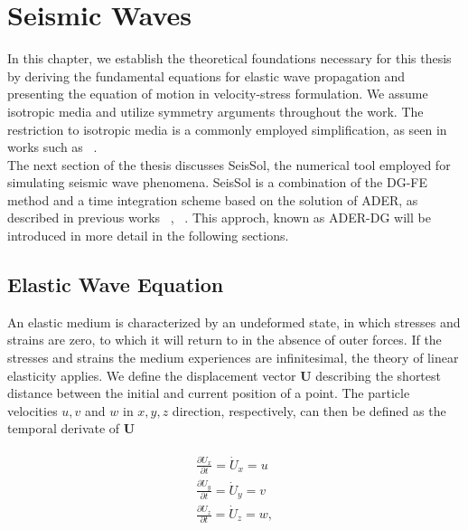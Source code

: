 
\chapter{Seismic Waves}\label{chapter:seismicwaves}
In this chapter, we establish the theoretical foundations necessary for this thesis by deriving the fundamental equations for elastic
wave propagation and presenting the equation of motion in velocity-stress formulation. We assume isotropic media and utilize symmetry arguments
throughout the work. The restriction to isotropic media is a commonly employed simplification, as seen in works such as ~\parencite{dumbser1}. \\

The next section of the thesis discusses SeisSol, the numerical tool employed for simulating seismic wave phenomena. SeisSol is a combination
of the \ac{DG-FE} method and a time integration scheme based on the solution of \ac{ADER}, as described in previous works ~\parencite{dumbser1}, ~\parencite{seissol}. This approch, known as 
\ac{ADER}-\ac{DG} will be introduced in more detail in the following sections.

\section{Elastic Wave Equation}\label{section:elasticwaveequation}
An elastic medium is characterized by an undeformed state, in which stresses and strains are zero, to which it will return to in the absence
of outer forces. If the stresses and strains the medium experiences are infinitesimal, the theory of linear elasticity applies. We define
the displacement vector $\mathbf{U}$ describing the shortest distance between the initial and current position of a point. The particle
velocities $u,v$ and $w$ in $x, y, z$ direction, respectively, can then be defined as the temporal derivate of $\mathbf{U}$

\begin{align}
    \begin{split}
    \frac{\partial U_x}{\partial t} = \dot{U}_x = u \\
    \frac{\partial U_y}{\partial t} = \dot{U}_y = v \\
    \frac{\partial U_z}{\partial t} = \dot{U}_z = w, \\
    \end{split}
 \end{align}

